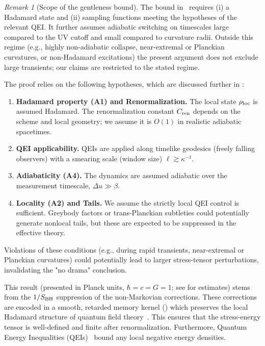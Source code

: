 \documentclass[a4paper,11pt]{article}
\newcommand{\eg}{e.g.\xspace}
\theoremstyle{plain}
\theoremstyle{definition}
\theoremstyle{remark}
\newtheorem{remark}{Remark}
\begin{document}
\begin{remark}[Scope of the gentleness bound]
The bound in~ requires (i) a Hadamard state and (ii) sampling functions meeting the hypotheses of the relevant QEI. It further assumes adiabatic switching on timescales large compared to the UV cutoff and small compared to curvature radii. Outside this regime (\eg, highly non-adiabatic collapse, near-extremal or Planckian curvatures, or non-Hadamard excitations) the present argument does not exclude large transients; our claims are restricted to the stated regime.

The proof relies on the following hypotheses, which are discussed further in :
\begin{enumerate}[label=(\roman*)]
    \item \textbf{Hadamard property (A1) and Renormalization.} The local state $\rho_{\rm loc}$ is assumed Hadamard. The renormalization constant $C_{\rm ren}$ depends on the scheme and local geometry; we assume it is $O(1)$ in realistic adiabatic spacetimes.
    \item \textbf{QEI applicability.} QEIs are applied along timelike geodesics (freely falling observers) with a smearing scale (window size) $\ell \gtrsim \kappa^{-1}$.
    \item \textbf{Adiabaticity (A4).} The dynamics are assumed adiabatic over the measurement timescale, $\Delta u \gg \beta$.
    \item \textbf{Locality (A2) and Tails.} We assume the strictly local QEI control is sufficient. Greybody factors or trans-Planckian subtleties could potentially generate nonlocal tails, but these are expected to be suppressed in the effective theory.
\end{enumerate}
Violations of these conditions (\eg, during rapid transients, near-extremal or Planckian curvatures) could potentially lead to larger stress-tensor perturbations, invalidating the "no drama" conclusion.
\end{remark}

This result (presented in Planck units, $\hbar=c=G=1$; see  for estimates) stems from the $1/S_{\rm BH}$ suppression of the non-Markovian corrections. These corrections are encoded in a smooth, retarded memory kernel () which preserves the local Hadamard structure of quantum field theory~\cite{Radzikowski:1996}. This ensures that the stress-energy tensor is well-defined and finite after renormalization. Furthermore, Quantum Energy Inequalities (QEIs)~\cite{Fewster:2012} bound any local negative energy densities.
\end{document}
